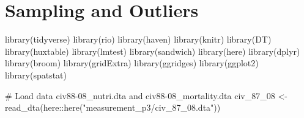 \documentclass[
  letterpaper,
  DIV=11,
  numbers=noendperiod]{scrartcl}
\author{}
\date{}
\newenvironment{Shaded}{\begin{snugshade}}{\end{snugshade}}
\newcommand{\CommentTok}[1]{\textcolor[rgb]{0.37,0.37,0.37}{#1}}
\newcommand{\FunctionTok}[1]{\textcolor[rgb]{0.28,0.35,0.67}{#1}}
\newcommand{\NormalTok}[1]{\textcolor[rgb]{0.00,0.23,0.31}{#1}}
\newcommand{\OtherTok}[1]{\textcolor[rgb]{0.00,0.23,0.31}{#1}}
\newcommand{\SpecialCharTok}[1]{\textcolor[rgb]{0.37,0.37,0.37}{#1}}
\newcommand{\StringTok}[1]{\textcolor[rgb]{0.13,0.47,0.30}{#1}}
\begin{document}
\section{Sampling and Outliers}\label{sampling-and-outliers}

\begin{Shaded}
\begin{Highlighting}[]
\FunctionTok{library}\NormalTok{(tidyverse)}
\FunctionTok{library}\NormalTok{(rio)}
\FunctionTok{library}\NormalTok{(haven)}
\FunctionTok{library}\NormalTok{(knitr)}
\FunctionTok{library}\NormalTok{(DT)}
\FunctionTok{library}\NormalTok{(huxtable)}
\FunctionTok{library}\NormalTok{(lmtest)}
\FunctionTok{library}\NormalTok{(sandwich)}
\FunctionTok{library}\NormalTok{(here)}
\FunctionTok{library}\NormalTok{(dplyr)}
\FunctionTok{library}\NormalTok{(broom)}
\FunctionTok{library}\NormalTok{(gridExtra)}
\FunctionTok{library}\NormalTok{(ggridges)}
\FunctionTok{library}\NormalTok{(ggplot2)}
\FunctionTok{library}\NormalTok{(spatstat)}
\end{Highlighting}
\end{Shaded}

\begin{Shaded}
\begin{Highlighting}[]
\CommentTok{\# Load data civ88{-}08\_nutri.dta and civ88{-}08\_mortality.dta}
\NormalTok{civ\_87\_08 }\OtherTok{\textless{}{-}} \FunctionTok{read\_dta}\NormalTok{(here}\SpecialCharTok{::}\FunctionTok{here}\NormalTok{(}\StringTok{"measurement\_p3/civ\_87\_08.dta"}\NormalTok{))}
\end{Highlighting}
\end{Shaded}
\end{document}
